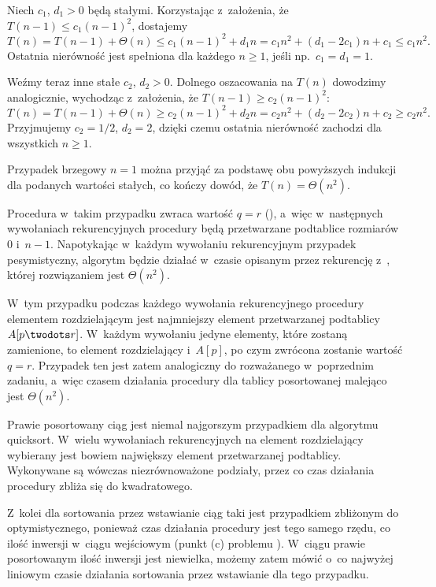 
\exercise %
Niech $c_1$, $d_1>0$ będą stałymi.
Korzystając z~założenia, że $T(n-1)\le c_1(n-1)^2$, dostajemy
\[
	T(n) = T(n-1)+\Theta(n) \le c_1(n-1)^2+d_1n = c_1n^2+(d_1-2c_1)n+c_1 \le c_1n^2.
\]
Ostatnia nierówność jest spełniona dla każdego $n\ge1$, jeśli np.\ $c_1=d_1=1$.

Weźmy teraz inne stałe $c_2$, $d_2>0$.
Dolnego oszacowania na $T(n)$ dowodzimy analogicznie, wychodząc z~założenia, że $T(n-1)\ge c_2(n-1)^2$:
\[
	T(n) = T(n-1)+\Theta(n) \ge c_2(n-1)^2+d_2n = c_2n^2+(d_2-2c_2)n+c_2 \ge c_2n^2.
\]
Przyjmujemy $c_2=1/2$, $d_2=2$, dzięki czemu ostatnia nierówność zachodzi dla wszystkich $n\ge1$.

Przypadek brzegowy $n=1$ można przyjąć za podstawę obu powyższych indukcji dla podanych wartości stałych, co kończy dowód, że $T(n)=\Theta(n^2)$.

\exercise %
Procedura  w~takim przypadku zwraca wartość $q=r$ (), a~więc w~następnych wywołaniach rekurencyjnych procedury  będą przetwarzane podtablice rozmiarów 0 i~$n-1$.
Napotykając w~każdym wywołaniu rekurencyjnym przypadek pesymistyczny, algorytm będzie działać w~czasie opisanym przez rekurencję z~, której rozwiązaniem jest $\Theta(n^2)$.

\exercise %
W~tym przypadku podczas każdego wywołania rekurencyjnego procedury  elementem rozdzielającym jest najmniejszy element przetwarzanej podtablicy $A[p\twodots r]$.
W~każdym wywołaniu jedyne elementy, które zostaną zamienione, to element rozdzielający i~$A[p]$, po czym zwrócona zostanie wartość $q=r$.
Przypadek ten jest zatem analogiczny do rozważanego w~poprzednim zadaniu, a~więc czasem działania procedury  dla tablicy posortowanej malejąco jest $\Theta(n^2)$.

\exercise %
Prawie posortowany ciąg jest niemal najgorszym przypadkiem dla algorytmu quicksort.
W~wielu wywołaniach rekurencyjnych na element rozdzielający wybierany jest bowiem największy element przetwarzanej podtablicy.
Wykonywane są wówczas niezrównoważone podziały, przez co czas działania procedury  zbliża się do kwadratowego.

Z~kolei dla sortowania przez wstawianie ciąg taki jest przypadkiem zbliżonym do optymistycznego, ponieważ czas działania procedury  jest tego samego rzędu, co ilość inwersji w~ciągu wejściowym (punkt (c) problemu ).
W~ciągu prawie posortowanym ilość inwersji jest niewielka, możemy zatem mówić o~co najwyżej liniowym czasie działania sortowania przez wstawianie dla tego przypadku.

